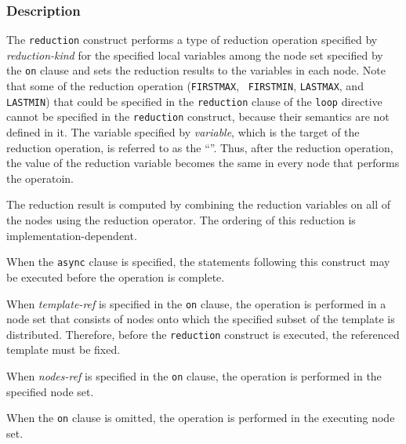\subsubsection*{Description}

The {\tt reduction} construct performs a type of
reduction operation specified by {\it reduction-kind} for the specified
local variables among the node set specified by the {\tt on}
clause and sets the reduction results to the variables in each
node.
%
Note that some of the reduction operation ({\tt FIRSTMAX}, {\tt
FIRSTMIN}, {\tt LASTMAX}, and {\tt LASTMIN}) that could be specified in
the {\tt reduction} clause of the {\tt loop} directive cannot be
specified in the {\tt reduction} construct, because their semantics are
not defined in it.
%
The variable specified by {\it variable}, which is the target of the
reduction operation, is referred to as the ``''. Thus, after the reduction operation, the value of the
reduction variable becomes the same in every node that performs the
operatoin.

The reduction result is computed by combining the reduction variables on
all of the nodes using the reduction operator. The ordering of this
reduction is implementation-dependent.

When the {\tt async} clause is specified, the statements following this
construct may be executed before the operation is complete.

When {\it template-ref} is specified in the {\tt on} clause, the operation
is performed in a node set that consists of nodes onto which the
specified subset of the template is distributed.
Therefore, before the {\tt reduction} construct is executed, the
referenced template must be fixed.
%
%

When {\it nodes-ref} is specified in the {\tt on} clause, the operation
is performed in the specified node set.

When the {\tt on} clause is omitted, the operation is performed in the
executing node set.

